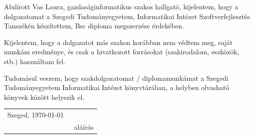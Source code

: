 \documentclass[12pt]{report}
\theoremstyle{definition}
\begin{document}

\noindent
Alulírott %
Vas Laura, gazdaságinformatikus szakos hallgató, kijelentem, hogy a dolgozatomat a Szegedi Tudományegyetem, Informatikai Intézet %
Szoftverfejlesztés Tanszékén készítettem, %
Bsc diploma megszerzése érdekében.

Kijelentem, hogy a dolgozatot más szakon korábban nem védtem meg, saját munkám eredménye, és csak a hivatkozott forrásokat (szakirodalom, eszközök, stb.) használtam fel.

Tudomásul veszem, hogy szakdolgozatomat / diplomamunkámat a Szegedi Tudományegyetem Informatikai Intézet könyvtárában, a helyben olvasható könyvek között helyezik el. 

\vspace*{2cm}

\begin{tabular}{lc}
	Szeged, \today\
	\hspace{2cm} & \makebox[6cm]{\dotfill} \\
	             & aláírás                 \\
\end{tabular}


\vspace*{4cm}






%
%

 
\end{document}
